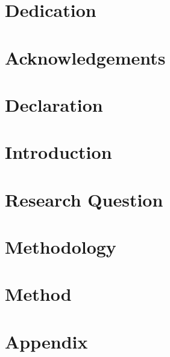\documentclass[a4paper,12pt]{report}
\begin{document}



\chapter*{Dedication}

\chapter*{Acknowledgements}

\chapter*{Declaration}


\tableofcontents
\listoffigures
\listoftables

\chapter{Introduction}

\chapter{Research Question}

\chapter{Methodology}

\chapter{Method}

% 
% 
% 

\appendix

\chapter{Appendix}


\printbibliography

\end{document}
